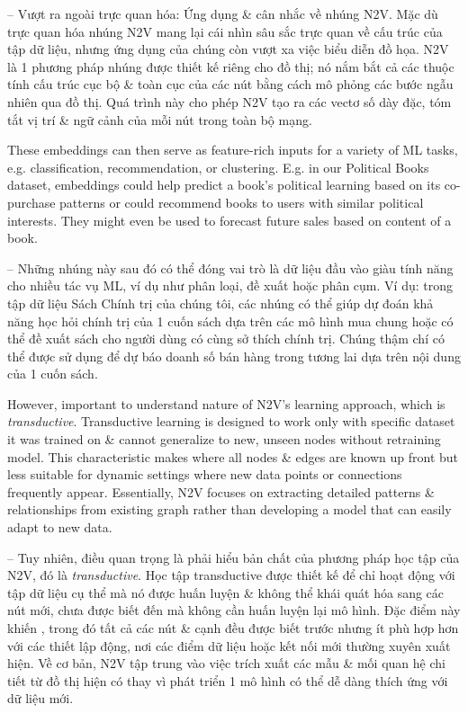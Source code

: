 \documentclass{article}
\begin{document}
\begin{itemize}
\begin{itemize}
\begin{itemize}
           -- {\sf Vượt ra ngoài trực quan hóa: Ứng dụng \& cân nhắc về nhúng N2V.} Mặc dù trực quan hóa nhúng N2V mang lại cái nhìn sâu sắc trực quan về cấu trúc của tập dữ liệu, nhưng ứng dụng của chúng còn vượt xa việc biểu diễn đồ họa. N2V là 1 phương pháp nhúng được thiết kế riêng cho đồ thị; nó nắm bắt cả các thuộc tính cấu trúc cục bộ \& toàn cục của các nút bằng cách mô phỏng các bước ngẫu nhiên qua đồ thị. Quá trình này cho phép N2V tạo ra các vectơ số dày đặc, tóm tắt vị trí \& ngữ cảnh của mỗi nút trong toàn bộ mạng.

           These embeddings can then serve as feature-rich inputs for a variety of ML tasks, e.g. classification, recommendation, or clustering. E.g. in our Political Books dataset, embeddings could help predict a book's political learning based on its co-purchase patterns or could recommend books to users with similar political interests. They might even be used to forecast future sales based on content of a book.

           -- Những nhúng này sau đó có thể đóng vai trò là dữ liệu đầu vào giàu tính năng cho nhiều tác vụ ML, ví dụ như phân loại, đề xuất hoặc phân cụm. Ví dụ: trong tập dữ liệu Sách Chính trị của chúng tôi, các nhúng có thể giúp dự đoán khả năng học hỏi chính trị của 1 cuốn sách dựa trên các mô hình mua chung hoặc có thể đề xuất sách cho người dùng có cùng sở thích chính trị. Chúng thậm chí có thể được sử dụng để dự báo doanh số bán hàng trong tương lai dựa trên nội dung của 1 cuốn sách.

           However, important to understand nature of N2V's learning approach, which is {\it transductive}. Transductive learning is designed to work only with specific dataset it was trained on \& cannot generalize to new, unseen nodes without retraining model. This characteristic makes  where all nodes \& edges are known up front but less suitable for dynamic settings where new data points or connections frequently appear. Essentially, N2V focuses on extracting detailed patterns \& relationships from existing graph rather than developing a model that can easily adapt to new data.

           -- Tuy nhiên, điều quan trọng là phải hiểu bản chất của phương pháp học tập của N2V, đó là {\it transductive}. Học tập transductive được thiết kế để chỉ hoạt động với tập dữ liệu cụ thể mà nó được huấn luyện \& không thể khái quát hóa sang các nút mới, chưa được biết đến mà không cần huấn luyện lại mô hình. Đặc điểm này khiến , trong đó tất cả các nút \& cạnh đều được biết trước nhưng ít phù hợp hơn với các thiết lập động, nơi các điểm dữ liệu hoặc kết nối mới thường xuyên xuất hiện. Về cơ bản, N2V tập trung vào việc trích xuất các mẫu \& mối quan hệ chi tiết từ đồ thị hiện có thay vì phát triển 1 mô hình có thể dễ dàng thích ứng với dữ liệu mới.


\end{itemize}
\end{itemize}
\end{itemize}
\end{document}
